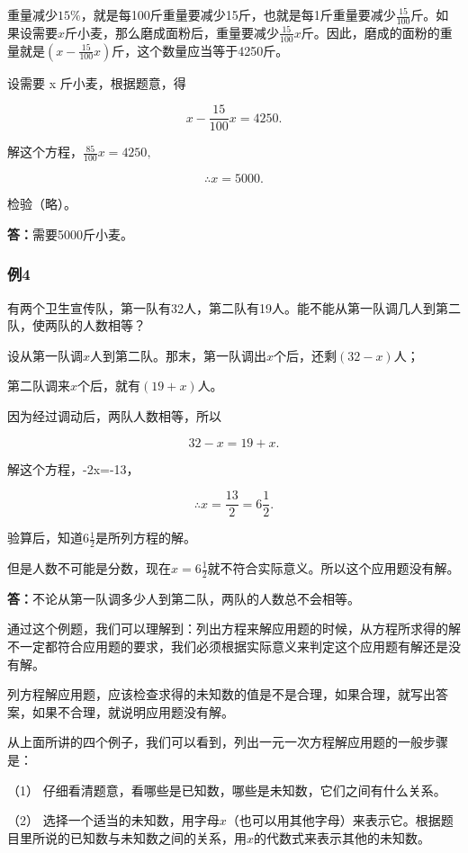 重量减少\(15\%\)，就是每100斤重量要减少15斤，也就是每1斤重量要减少\(\frac{15}{100}\)斤。如果设需要\(x\)斤小麦，那么磨成面粉后，重量要减少\(\frac{15}{100} x\)斤。因此，磨成的面粉的重量就是\(\left(x - \frac{15}{100} x\right)\)斤，这个数量应当等于4250斤。

 设需要 x 斤小麦，根据题意，得

\[
x - \frac{15}{100} x = 4250.
\]

解这个方程，\(\frac{85}{100} x = 4250,\)

\[
\therefore x = 5000.
\]

检验（略）。

\textbf{答：}需要5000斤小麦。

\subsubsection{例4}

有两个卫生宣传队，第一队有32人，第二队有19人。能不能从第一队调几人到第二队，使两队的人数相等？

设从第一队调\(x\)人到第二队。那末，第一队调出\(x\)个后，还剩\((32 - x)\)人；

第二队调来\(x\)个后，就有\((19 + x)\)人。

因为经过调动后，两队人数相等，所以

\[
32 - x = 19 + x.
\]

解这个方程，-2x=-13，

\[
\therefore x = \frac{13}{2} = 6\frac{1}{2}.
\]

验算后，知道\(6\frac{1}{2}\)是所列方程的解。

但是人数不可能是分数，现在\(x = 6\frac{1}{2}\)就不符合实际意义。所以这个应用题没有解。

\textbf{答：}不论从第一队调多少人到第二队，两队的人数总不会相等。

通过这个例题，我们可以理解到：列出方程来解应用题的时候，从方程所求得的解不一定都符合应用题的要求，我们必须根据实际意义来判定这个应用题有解还是没有解。

列方程解应用题，应该检查求得的未知数的值是不是合理，如果合理，就写出答案，如果不合理，就说明应用题没有解。

从上面所讲的四个例子，我们可以看到，列出一元一次方程解应用题的一般步骤是：

（1） 仔细看清题意，看哪些是已知数，哪些是未知数，它们之间有什么关系。

（2）
选择一个适当的未知数，用字母\(x\)（也可以用其他字母）来表示它。根据题目里所说的已知数与未知数之间的关系，用\(x\)的代数式来表示其他的未知数。

